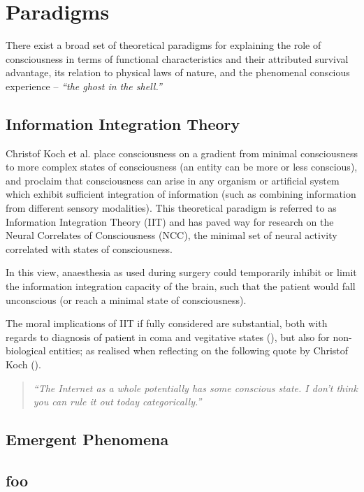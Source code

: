\section{Paradigms}

There exist a broad set of theoretical paradigms for explaining the role of consciousness in terms of functional characteristics and their attributed survival advantage, its relation to physical laws of nature, and the phenomenal conscious experience -- \textit{``the ghost in the shell.''}

\subsection{Information Integration Theory}

Christof Koch et al. \cite{foo} place consciousness on a gradient from minimal consciousness to more complex states of consciousness (an entity can be more or less conscious), and proclaim that consciousness can arise in any organism or artificial system which exhibit sufficient integration of information (such as combining information from different sensory modalities). This theoretical paradigm is referred to as Information Integration Theory (IIT) and has paved way for research on the Neural Correlates of Consciousness (NCC), the minimal set of neural activity correlated with states of consciousness.

In this view, anaesthesia as used during surgery could temporarily inhibit or limit the information integration capacity of the brain, such that the patient would fall unconscious (or reach a minimal state of consciousness).

The moral implications of IIT if fully considered are substantial, both with regards to diagnosis of patient in coma and vegitative states (), but also for non-biological entities; as realised when reflecting on the following quote by Christof Koch ().

\begin{quote}
	\textit{``The Internet as a whole potentially has some conscious state. I don't think you can rule it out today categorically.''}
\end{quote}

\subsection{Emergent Phenomena}


\subsection{foo}

